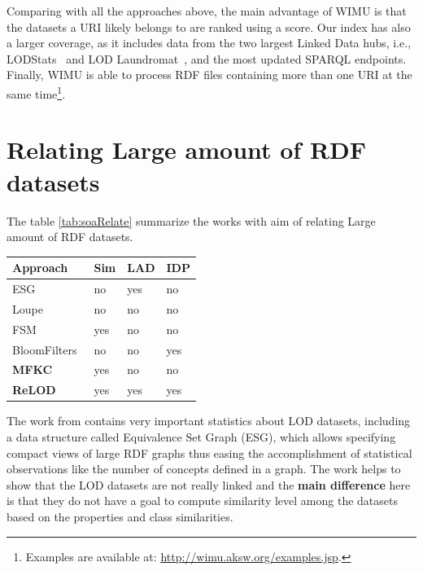 Comparing with all the approaches above, the main advantage of WIMU is that the datasets a URI likely belongs to are ranked using a score.
Our index has also a larger coverage, as it includes data from the two largest Linked Data hubs, i.e., LODStats~\cite{auer2012lodstats} and LOD Laundromat~\cite{beek2014lod}, and the most updated SPARQL endpoints.
Finally, WIMU is able to process RDF files containing more than one URI at the same time\footnote{Examples are available at: \url{http://wimu.aksw.org/examples.jsp}.}.

\section{Relating Large amount of RDF datasets}
The table \ref{tab:soaRelate} summarize the works with aim of relating Large amount of RDF datasets.

\begin{table}[H]
\caption{State of the art overview regarding to Relating Large amount of RDF datasets, withing the following characteristics: Compute similarity level among the datasets based on the properties and class similarities (Sim), Large amount of Data (LAD), Identify duplicated data (IDP)}
\label{tab:soaRelate}
\begin{center}
\begin{longtable}{@{}llll@{}}
\toprule
\textbf{Approach} & \textbf{Sim} & \textbf{LAD} & \textbf{IDP}\\ \midrule
ESG~\cite{asprino2019linked} & no & yes & no\\
Loupe~\cite{mihindukulasooriya2016two} & no & no & no \\
FSM~\cite{emaldi2015detection} & yes & no & no \\
BloomFilters~\cite{baron-2016-ldow-assessing-links} & no & no & yes \\
\textbf{MFKC}~\cite{valdestilhas2017high} & yes & no & no\\
\textbf{ReLOD}~\cite{valdestilhasSWJ2020} & yes & yes & yes\\
\bottomrule
\end{longtable}
\end{center}
\end{table}

The work from \cite{asprino2019linked,asprino2019observing,asprino2019triplifying} contains very important statistics about LOD datasets, including a data structure called Equivalence Set Graph (ESG), which allows specifying compact views of large RDF graphs thus easing the accomplishment of statistical observations like the number of concepts defined in a graph. The work helps to show that the LOD datasets are not really linked and the \textbf{main difference} here is that they do not have a goal to compute similarity level among the datasets based on the properties and class similarities.

